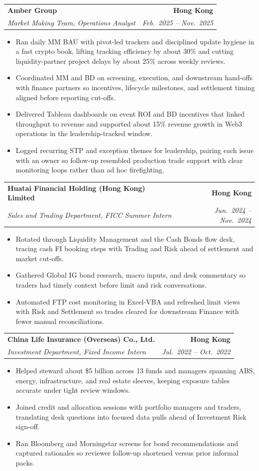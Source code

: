 \documentclass[9pt,a4paper]{extarticle}
\makeatletter
\newcommand{\resumeSubheading}[4]{%
  \vspace{0.6em}%
  \begin{tabular*}{\textwidth}{l@{\extracolsep{\fill}}r}
    \textbf{#1} & \textbf{#2} \\
    \textit{\small #3} & \textit{\small #4} \\
  \end{tabular*}\vspace{0.32em}}
\makeatother
\begin{document}
\resumeSubheading{Amber Group}{Hong Kong}{Market Making Team, Operations Analyst}{Feb.\ 2025 -- Nov.\ 2025}
\begin{itemize}
  \item Ran daily MM BAU with pivot-led trackers and disciplined update hygiene in a fast crypto book, lifting tracking efficiency by about 30\% and cutting liquidity-partner project delays by about 25\% across weekly reviews.
  \item Coordinated MM and BD on screening, execution, and downstream hand-offs with finance partners so incentives, lifecycle milestones, and settlement timing aligned before reporting cut-offs.
  \item Delivered Tableau dashboards on event ROI and BD incentives that linked throughput to revenue and supported about 15\% revenue growth in Web3 operations in the leadership-tracked window.
  \item Logged recurring STP and exception themes for leadership, pairing each issue with an owner so follow-up resembled production trade support with clear monitoring loops rather than ad hoc firefighting.
\end{itemize}

\resumeSubheading{Huatai Financial Holding (Hong Kong) Limited}{Hong Kong}{Sales and Trading Department, FICC Summer Intern}{Jun.\ 2024 -- Nov.\ 2024}
\begin{itemize}
  \item Rotated through Liquidity Management and the Cash Bonds flow desk, tracing cash FI booking steps with Trading and Risk ahead of settlement and market cut-offs.
  \item Gathered Global IG bond research, macro inputs, and desk commentary so traders had timely context before limit and risk conversations.
  \item Automated FTP cost monitoring in Excel-VBA and refreshed limit views with Risk and Settlement so trades cleared for downstream Finance with fewer manual reconciliations.
\end{itemize}

\resumeSubheading{China Life Insurance (Overseas) Co., Ltd.}{Hong Kong}{Investment Department, Fixed Income Intern}{Jul.\ 2022 -- Oct.\ 2022}
\begin{itemize}
  \item Helped steward about \$5 billion across 13 funds and managers spanning ABS, energy, infrastructure, and real estate sleeves, keeping exposure tables accurate under tight review windows.
  \item Joined credit and allocation sessions with portfolio managers and traders, translating desk questions into focused data pulls ahead of Investment Risk sign-off.
  \item Ran Bloomberg and Morningstar screens for bond recommendations and captured rationales so reviewer follow-up shortened versus prior informal packs.
\end{itemize}
\end{document}
